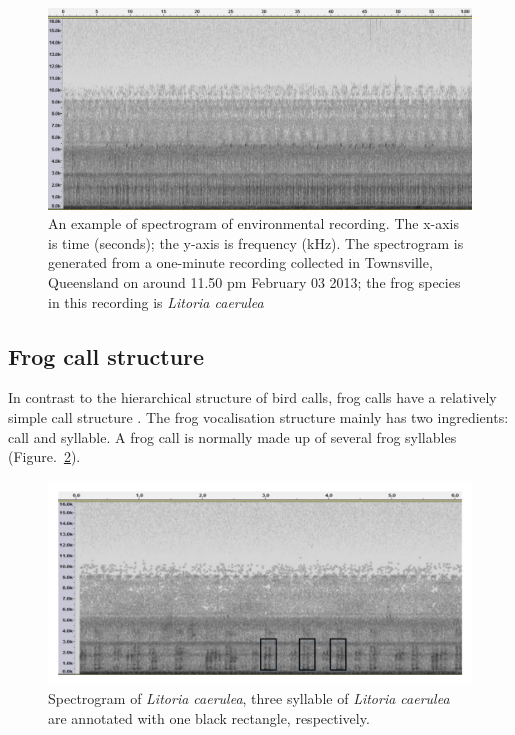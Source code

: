 \begin{figure}[htb!]
\centering
\includegraphics[width=\textwidth]{image/Ch1/spectrogram_example.png}
\caption[An example of spectrogram of environmental recording]{An example of spectrogram of environmental recording. The x-axis is time (seconds); the y-axis is frequency (kHz). The spectrogram is generated from a one-minute recording collected in Townsville, Queensland on around 11.50 pm February 03 2013; the frog species in this recording is \textit{Litoria caerulea}}
\label{fig:Ch1_spectrogram}
\end{figure}





\subsection{Frog call structure}
In contrast to the hierarchical structure of bird calls, frog calls have a relatively simple call structure \citep{somervuo2006parametric}. The frog vocalisation structure mainly has two ingredients: call and syllable. A frog call is normally made up of several frog syllables (Figure.~\ref{fig:Ch1_spec_mark}).

\begin{figure}[htb!]
\centering
\includegraphics[width=\textwidth]{image/Ch1/spectrogram_mark.pdf}
\caption[Spectrogram of \textit{Litoria caerulea}]{Spectrogram of \textit{Litoria caerulea}, three syllable of \textit{Litoria caerulea} are annotated with one black rectangle, respectively.}
\label{fig:Ch1_spec_mark}
\end{figure}




